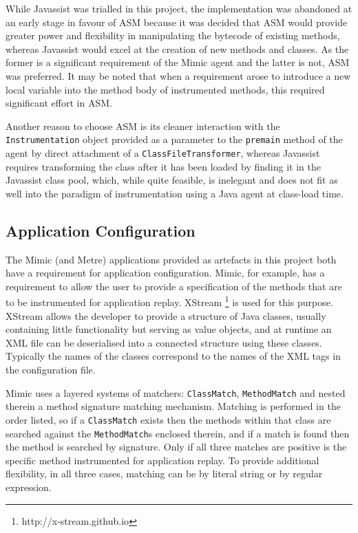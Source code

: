\documentclass[]{final_report}
\begin{document}
While Javassist was trialled in this project, the implementation was abandoned at an early stage in favour of ASM because it was decided that ASM would provide greater power and flexibility in manipulating the bytecode of existing methods, whereas Javassist would excel at the creation of new methods and classes. As the former is a significant requirement of the Mimic agent and the latter is not, ASM was preferred. It may be noted that when a requirement arose to introduce a new local variable into the method body of instrumented methods, this required significant effort in ASM.

Another reason to choose ASM is its cleaner interaction with the \lstinline{Instrumentation}\noop{} object provided as a parameter to the \lstinline{premain}\noop{} method of the agent by direct attachment of a \linebreak[4] \lstinline{ClassFileTransformer}\noop{}, whereas Javassist requires transforming the class after it has been loaded by finding it in the Javassist class pool, which, while quite feasible, is inelegant and does not fit as well into the paradigm of instrumentation using a Java agent at class-load time.

\subsection{Application Configuration \label{application_configuration}}

The Mimic (and Metre) applications provided as artefacts in this project both have a requirement for application configuration. Mimic, for example, has a requirement to allow the user to provide a specification of the methods that are to be instrumented for application replay. XStream \footnote{{http://x-stream.github.io}} is used for this purpose. XStream allows the developer to provide a structure of Java classes, usually containing little functionality but serving as value objects, and at runtime an XML file can be deserialised into a connected structure using these classes. Typically the names of the classes correspond to the names of the XML tags in the configuration file.

Mimic uses a layered systems of matchers: \lstinline{ClassMatch}, \lstinline{MethodMatch} and nested therein a method signature matching mechanism. Matching is performed in the order listed, so if a \lstinline{ClassMatch}\noop{} exists then the methods within that class are searched against the \lstinline{MethodMatch}s \noop{} enclosed therein, and if a match is found then the method is searched by signature. Only if all three matches are positive is the specific method instrumented for application replay. To provide additional flexibility, in all three cases, matching can be by literal string or by regular expression.
\end{document}
